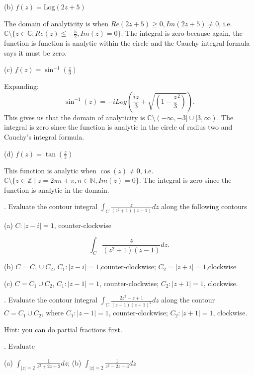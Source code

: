 \documentclass[letterpaper, reqno,11pt]{article}
\begin{document}
(b) $ f(z) = \mbox{Log} (2z+5)$

The domain of analyticity is when $Re(2z+5)\geq 0, Im(2z+5)\neq 0$, i.e. $\mathbb{C}\setminus \{z\in\mathbb{C} : Re(z)\leq -\frac{5}{2}, Im(z)=0\} $. The integral is zero because again, the function is function is analytic within the circle and the Cauchy integral formula says it must be zero. 

(c) $ f(z)= \sin^{-1} (\frac{z}{3})$

Expanding: 
\[
\sin^{-1}(z)=-iLog\left( \frac{iz}{3}+\sqrt{ (1-\frac{z}{3}^2)} \right) 
.\]
This gives us that the domain of analyticity is $\mathbb{C}\setminus(-\infty, -3]\cup [3, \infty) $. The integral is zero since the function is analytic in the circle of radius two and Cauchy's integral formula. 

(d) $ f(z)= \tan (\frac{z}{2}) $

This function is analytic when $\cos(z)\neq 0$, i.e. $ \mathbb{C}\setminus\{z\in\mathbb Z\mid z=2\pi n+\pi, n\in\mathbb{N}, Im(z)=0\} $. The integral is zero since the function is analytic in the domain. 

\medskip





. Evaluate the contour integral $\int_{C} \frac{z}{ (z^2+1)(z-1)} dz$ along the following contours

(a) $C: | z-i|=1$, counter-clockwise

\[
\int_{C} \frac{z}{ (z^2+1)(z-1)} dz
.\]

(b) $C= C_1 \cup C_2$, $C_1: |z-i|=1$,counter-clockwise; $C_2= |z+i|=1$,clockwise

(c) $C= C_1 \cup C_2 $, $C_1: |z-1|=1$, counter-clockwise; $C_2:  |z+1|=1$, clockwise.



\medskip


. Evaluate the contour integral $ \int_{C} \frac{2z^2-z+1}{ (z-1)(z+1)^2} dz $ along the contour $C= C_1 \cup C_2 $, where $C_1: |z-1|=1$, counter-clockwise; $C_2:  |z+1|=1$, clockwise.


Hint: you can do partial fractions first.
\medskip


. Evaluate

(a) $\int_{|z|=2} \frac{1}{ z^2 +2z +2} dz$; (b) $ \int_{|z|=2} \frac{ 1}{ z^2 -2z-3} dz $
\end{document}
